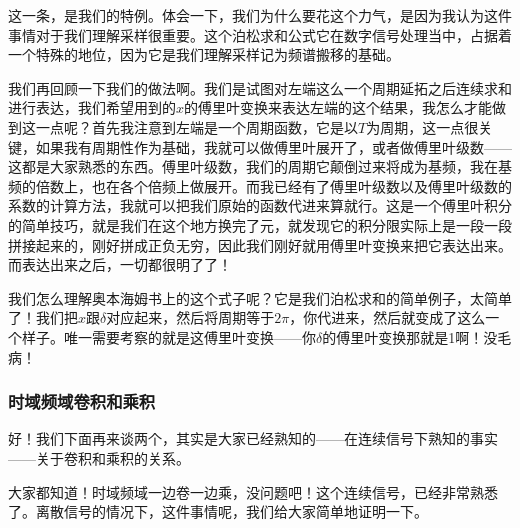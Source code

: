 \documentclass[a4paper,12pt]{article}
\begin{document}
这一条，是我们的特例。体会一下，我们为什么要花这个力气，是因为我认为这件事情对于我们理解采样很重要。这个泊松求和公式它在数字信号处理当中，占据着一个特殊的地位，因为它是我们理解采样记为频谱搬移的基础。

我们再回顾一下我们的做法啊。我们是试图对左端这么一个周期延拓之后连续求和进行表达，我们希望用到的$x$的傅里叶变换来表达左端的这个结果，我怎么才能做到这一点呢？首先我注意到左端是一个周期函数，它是以$T$为周期，这一点很关键，如果我有周期性作为基础，我就可以做傅里叶展开了，或者做傅里叶级数——这都是大家熟悉的东西。傅里叶级数，我们的周期它颠倒过来将成为基频，我在基频的倍数上，也在各个倍频上做展开。而我已经有了傅里叶级数以及傅里叶级数的系数的计算方法，我就可以把我们原始的函数代进来算就行。这是一个傅里叶积分的简单技巧，就是我们在这个地方换完了元，就发现它的积分限实际上是一段一段拼接起来的，刚好拼成正负无穷，因此我们刚好就用傅里叶变换来把它表达出来。而表达出来之后，一切都很明了了！

我们怎么理解奥本海姆书上的这个式子呢？它是我们泊松求和的简单例子，太简单了！我们把$x$跟$\delta$对应起来，然后将周期等于$2\pi$，你代进来，然后就变成了这么一个样子。唯一需要考察的就是这傅里叶变换——你$\delta$的傅里叶变换那就是1啊！没毛病！

\subsubsection{时域频域卷积和乘积}\quad

好！我们下面再来谈两个，其实是大家已经熟知的——在连续信号下熟知的事实——关于卷积和乘积的关系。

大家都知道！时域频域一边卷一边乘，没问题吧！这个连续信号，已经非常熟悉了。离散信号的情况下，这件事情呢，我们给大家简单地证明一下。
\end{document}
